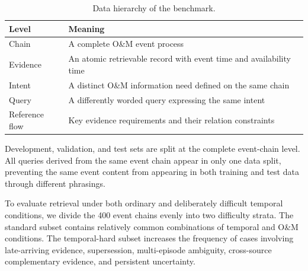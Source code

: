 

\begin{table}[t]
\caption{Data hierarchy of the benchmark.}
\label{tab:dataset_structure}
\centering
\small
\begin{tabular}{@{}>{\centering\arraybackslash}p{}>{\centering\arraybackslash}p{}@{}}
\toprule
Level & Meaning \\
\midrule
Chain & A complete O\&M event process \\
Evidence & An atomic retrievable record with event time and availability time \\
Intent & A distinct O\&M information need defined on the same chain \\
Query & A differently worded query expressing the same intent \\
Reference flow & Key evidence requirements and their relation constraints \\
\bottomrule
\end{tabular}
\end{table}

 Development, validation, and test sets are split at the complete event-chain level. All queries derived from the same event chain appear in only one data split, preventing the same event content from appearing in both training and test data through different phrasings.

To evaluate retrieval under both ordinary and deliberately difficult temporal conditions, we divide the 400 event chains evenly into two difficulty strata. The standard subset contains relatively common combinations of temporal and O\&M conditions. The temporal-hard subset increases the frequency of cases involving late-arriving evidence, supersession, multi-episode ambiguity, cross-source complementary evidence, and persistent uncertainty.

